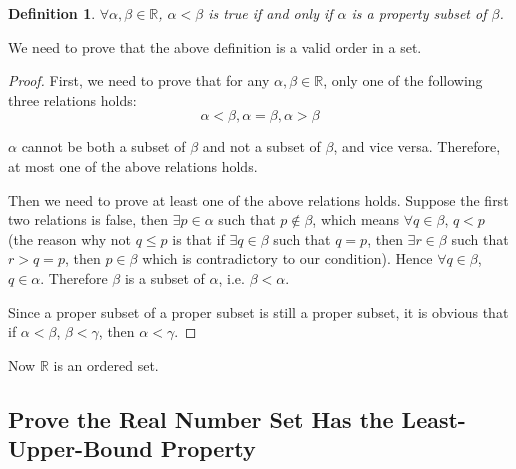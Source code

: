 \documentclass{article}
\newtheorem{definition}{Definition}[section]
\begin{document}
\begin{definition}
  $\forall \alpha, \beta \in \mathbb{R}$, $\alpha < \beta$ is true if and only 
  if $\alpha$ is a property subset of $\beta$.
\end{definition}
We need to prove that the above definition is a valid order in a set.
\begin{proof}
  First, we need to prove that for any $\alpha, \beta \in \mathbb{R}$, only one 
  of the following three relations holds:
  \[
    \alpha < \beta, \alpha = \beta, \alpha > \beta
  \]

  $\alpha$ cannot be both a subset of $\beta$ and not a subset of $\beta$, and 
  vice versa. Therefore, at most one of the above relations holds.

  Then we need to prove at least one of the above relations holds. Suppose the 
  first two relations is false, then $\exists p \in \alpha$ such that 
  $p \notin \beta$, which means $\forall q \in \beta$, $q < p$ (the reason why 
  not $q \leq p$ is that if $\exists q \in \beta$ such that $q = p$, then 
  $\exists r \in \beta$ such that $r > q = p$, then $p \in \beta$ which is 
  contradictory to our condition). Hence $\forall q \in \beta$, $q \in \alpha$. 
  Therefore $\beta$ is a subset of $\alpha$, i.e. $\beta < \alpha$.

  Since a proper subset of a proper subset is still a proper subset, it is 
  obvious that if $\alpha < \beta$, $\beta < \gamma$, then $\alpha < \gamma$.
\end{proof}

Now $\mathbb{R}$ is an ordered set.

\subsection{Prove the Real Number Set Has the Least-Upper-Bound Property}
\end{document}
